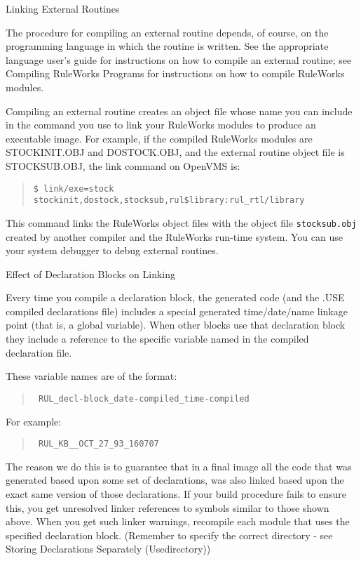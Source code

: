 Linking External Routines

The procedure for compiling an external routine depends,
of course, on the programming language in which the
routine is written. See the appropriate language user's
guide for instructions on how to compile an external
routine; see Compiling RuleWorks Programs for
instructions on how to compile RuleWorks modules.

Compiling an external routine creates an object file
whose name you can include in the command you use to link
your RuleWorks modules to produce an executable image.
For example, if the compiled RuleWorks modules are
STOCKINIT.OBJ and DOSTOCK.OBJ, and the external routine
object file is STOCKSUB.OBJ, the link command on OpenVMS
is:
\begin{quote}
\begin{verbatim}
$ link/exe=stock stockinit,dostock,stocksub,rul$library:rul_rtl/library
\end{verbatim}
\end{quote}  
This command links the RuleWorks object files with the
object file \verb|stocksub.obj| created by another compiler and
the RuleWorks run-time system. You can use your system
debugger to debug external routines.

Effect of Declaration Blocks on Linking

Every time you compile a declaration block, the generated
code (and the .USE compiled declarations file) includes a
special generated time/date/name linkage point (that is,
a global variable). When other blocks use that
declaration block they include a reference to the
specific variable named in the compiled declaration file.

These variable names are of the format:
\begin{quote}
\begin{verbatim}
 RUL_decl-block_date-compiled_time-compiled
\end{verbatim}
\end{quote}
For example:
\begin{quote}
\begin{verbatim}
 RUL_KB__OCT_27_93_160707
\end{verbatim}
\end{quote}  
The reason we do this is to guarantee that in a final
image all the code that was generated based upon some set
of declarations, was also linked based upon the exact
same version of those declarations. If your build
procedure fails to ensure this, you get unresolved linker
references to symbols similar to those shown above. When
you get such linker warnings, recompile each module that
uses the specified declaration block. (Remember to
specify the correct directory - see Storing Declarations
Separately (Usedirectory))

